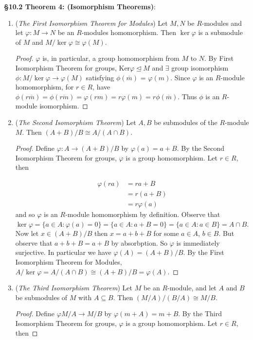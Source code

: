 \documentclass[8pt]{amsart}
\theoremstyle{plain}%
\theoremstyle{definition}
\theoremstyle{remark}
\numberwithin{equation}{section}
\begin{document}
\textbf{\S10.2 Theorem 4: (Isomorphism Theorems)}:
	\begin{enumerate}
		\item (\textit{The First Isomorphism Theorem for Modules}) Let $M, N$ be $R$-modules and let $\varphi : M \to N$ be an $R$-modules homomorphism. Then $\ker \varphi$ is a submodule of $M$ and $M/\ker \varphi \cong \varphi(M)$.
			\begin{proof}
				$\varphi$ is, in particular, a group homomorphism from $M$ to $N$. By First Isomorphism Theorem for groups, Ker$\varphi \trianglelefteq M$ and $\exists$ group isomorphism $\phi : M/\ker \varphi \to \varphi(M)$ satisfying $\phi(\overline{m})$ = $\varphi(m)$. Since $\varphi$ is an $R$-module homomorphism, for $r \in R$, have $\phi(r\overline{m}) = \phi(\overline{rm}) = \varphi(rm) = r\varphi(m) = r\phi(\overline{m})$. Thus $\phi$ is an $R$-module isomorphism.  
			\end{proof}
		\item (\textit{The Second Isomorphism Theorem}) Let $A, B$ be submodules of the $R$-module $M$. Then $(A + B)/B \cong A/(A \cap B)$.
			\begin{proof}
				Define $\varphi : A \to (A + B)/B$ by $\varphi(a) = a + B$. By the Second Isomorphism Theorem for groups, $\varphi$ is a group homomorphism. Let $r \in R$, then
				
				\begin{align*}
						\varphi(ra) &= ra + B\\
						&= r(a + B)\\
						&= r\varphi(a)
					\end{align*}
					and so $\varphi$ is an $R$-module homomorphism by definition. Observe that $\ker \varphi = \{a \in A : \varphi(a) = 0\} = \{a \in A : a + B = 0\} = \{a \in A : a \in B\} = A \cap B$. Now let $x \in (A + B)/B$ then $x = a + b + B$ for some $a \in A$, $b \in B$. But observe that $a + b + B = a + B$ by absorbption. So $\varphi$ is immediately surjective. In particular we have $\varphi(A) = (A + B)/B$. By the First Isomorphism Theorem for Modules, $A/\ker \varphi = A/(A \cap B) \cong (A + B)/B = \varphi(A)$.
			\end{proof}
		\item (\textit{The Third Isomorphism Theorem}) Let $M$ be an $R$-module, and let $A$ and $B$ be submodules of $M$ with $A \subseteq B$. Then $(M/A)/(B/A) \cong M/B$.
			\begin{proof}
				Define $\varphi M/A \to M/B$ by $\varphi(m + A) = m + B$. By the Third Isomorphism Theorem for groups, $\varphi$ is a group homomorphism. Let $r \in R$, then
				

\end{proof}
\end{enumerate}
\end{document}
